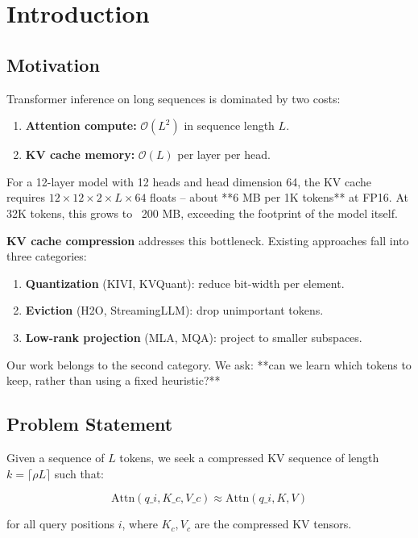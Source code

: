 \section{Introduction}

\subsection{Motivation}

Transformer inference on long sequences is dominated by two costs:

\begin{enumerate}
\item \textbf{Attention compute:} $\mathcal{O}(L^2)$ in sequence length $L$.
\item \textbf{KV cache memory:} $\mathcal{O}(L)$ per layer per head.

\end{enumerate}
For a 12-layer model with 12 heads and head dimension 64, the KV cache 
requires $12 \times 12 \times 2 \times L \times 64$ floats -- about **6 MB 
per 1K tokens** at FP16. At 32K tokens, this grows to ~200 MB, exceeding 
the footprint of the model itself.

\textbf{KV cache compression} addresses this bottleneck. Existing approaches fall 
into three categories:

\begin{enumerate}
\item \textbf{Quantization} (KIVI, KVQuant): reduce bit-width per element.
\item \textbf{Eviction} (H2O, StreamingLLM): drop unimportant tokens.
\item \textbf{Low-rank projection} (MLA, MQA): project to smaller subspaces.

\end{enumerate}
Our work belongs to the second category. We ask: **can we learn which tokens 
to keep, rather than using a fixed heuristic?**

\subsection{Problem Statement}

Given a sequence of $L$ tokens, we seek a compressed KV sequence of length 
$k = \lceil \rho L \rceil$ such that:

\[
\text{Attn}(q\_i, K\_c, V\_c) \approx \text{Attn}(q\_i, K, V)
\tag{1.1}
\]

for all query positions $i$, where $K_c, V_c$ are the compressed KV tensors.

